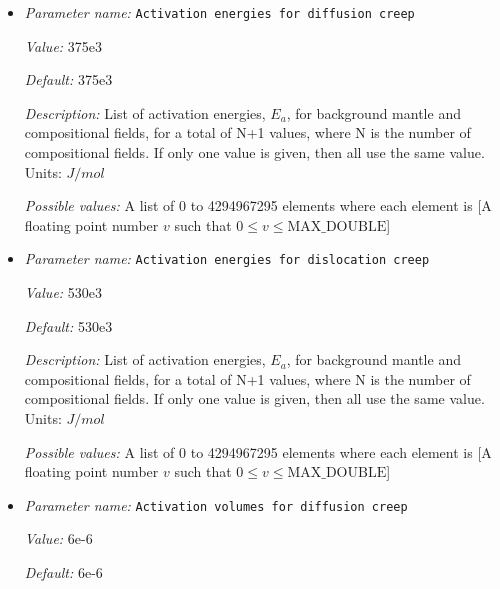 \begin{itemize}
\item {\it Parameter name:} {\tt Activation energies for diffusion creep}
\label{parameters:Material model/Diffusion dislocation/Activation energies for diffusion creep}


{\it Value:} 375e3


{\it Default:} 375e3


{\it Description:} List of activation energies, $E_a$, for background mantle and compositional fields, for a total of N+1 values, where N is the number of compositional fields. If only one value is given, then all use the same value.  Units: $J / mol$


{\it Possible values:} A list of 0 to 4294967295 elements where each element is [A floating point number $v$ such that $0 \leq v \leq \text{MAX\_DOUBLE}$]
\item {\it Parameter name:} {\tt Activation energies for dislocation creep}
\label{parameters:Material model/Diffusion dislocation/Activation energies for dislocation creep}


{\it Value:} 530e3


{\it Default:} 530e3


{\it Description:} List of activation energies, $E_a$, for background mantle and compositional fields, for a total of N+1 values, where N is the number of compositional fields. If only one value is given, then all use the same value.  Units: $J / mol$


{\it Possible values:} A list of 0 to 4294967295 elements where each element is [A floating point number $v$ such that $0 \leq v \leq \text{MAX\_DOUBLE}$]
\item {\it Parameter name:} {\tt Activation volumes for diffusion creep}
\label{parameters:Material model/Diffusion dislocation/Activation volumes for diffusion creep}


{\it Value:} 6e-6


{\it Default:} 6e-6



\end{itemize}
